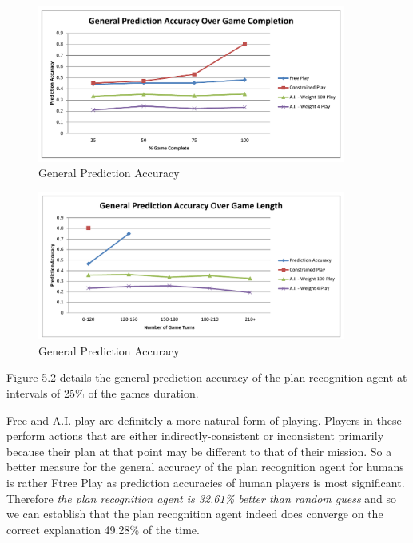 \documentclass[parskip]{cs4rep}
\begin{document}
\newpage

\begin{figure}[h]
\centerline{
\includegraphics[width=0.9\textwidth]{images/general-game-complete.pdf}
}
\caption{General Prediction Accuracy}
\label{fig:dom-debug-gui}
\end{figure} 

\begin{figure}[h]
\centerline{
\includegraphics[width=0.9\textwidth]{images/general-game-length.pdf}
}
\caption{General Prediction Accuracy}
\label{fig:dom-debug-gui}
\end{figure} 

Figure 5.2 details the general prediction accuracy of the plan recognition agent at intervals of 25\% of the games duration. 

Free and A.I. play are definitely a more natural form of playing. Players in these perform actions that are either indirectly-consistent or inconsistent primarily because their plan at that point may be different to that of their mission. So a better measure for the general accuracy of the plan recognition  agent for humans is rather Ftree Play as prediction accuracies of human players is most significant. Therefore \textit{the plan recognition agent is 32.61\% better than random guess} and so we can establish that the plan recognition agent indeed does converge on the correct explanation 49.28\% of the time.
\end{document}
